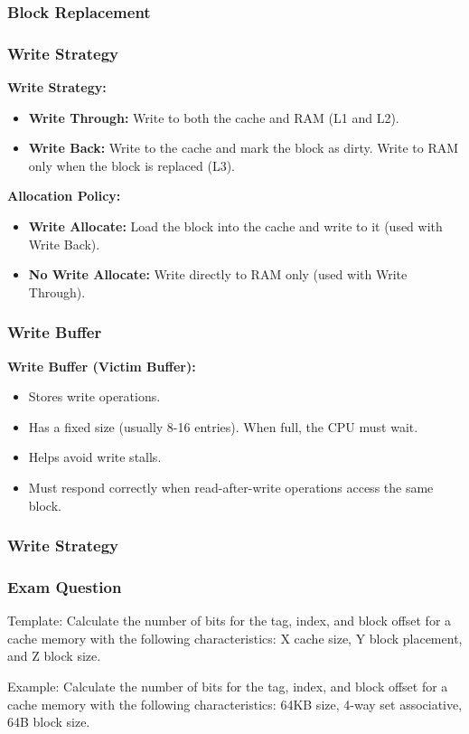 \begin{frame}
    \frametitle{Block Replacement}
\end{frame}

\begin{frame}
    \frametitle{Write Strategy}
    \textbf{Write Strategy:}
    \begin{itemize}
        \item \textbf{Write Through:} Write to both the cache and RAM (L1 and L2).
        \item \textbf{Write Back:} Write to the cache and mark the block as dirty. Write to RAM only when the block is replaced (L3).
    \end{itemize}
    
    \textbf{Allocation Policy:}
    \begin{itemize}
        \item \textbf{Write Allocate:} Load the block into the cache and write to it (used with Write Back).
        \item \textbf{No Write Allocate:} Write directly to RAM only (used with Write Through).
    \end{itemize}
\end{frame}

\begin{frame}
    \frametitle{Write Buffer}
    \textbf{Write Buffer (Victim Buffer):}
    \begin{itemize}
        \item Stores write operations.
        \item Has a fixed size (usually 8-16 entries). When full, the CPU must wait.
        \item Helps avoid write stalls.
        \item Must respond correctly when read-after-write operations access the same block.
    \end{itemize}
\end{frame}

\begin{frame}
    \frametitle{Write Strategy}
\end{frame}

\begin{frame}
    \frametitle{Exam Question}
    Template: Calculate the number of bits for the tag, index, and block offset for a cache memory with the following characteristics: X cache size, Y block placement, and Z block size.

    Example: Calculate the number of bits for the tag, index, and block offset for a cache memory with the following characteristics: 64KB size, 4-way set associative, 64B block size.
\end{frame}

